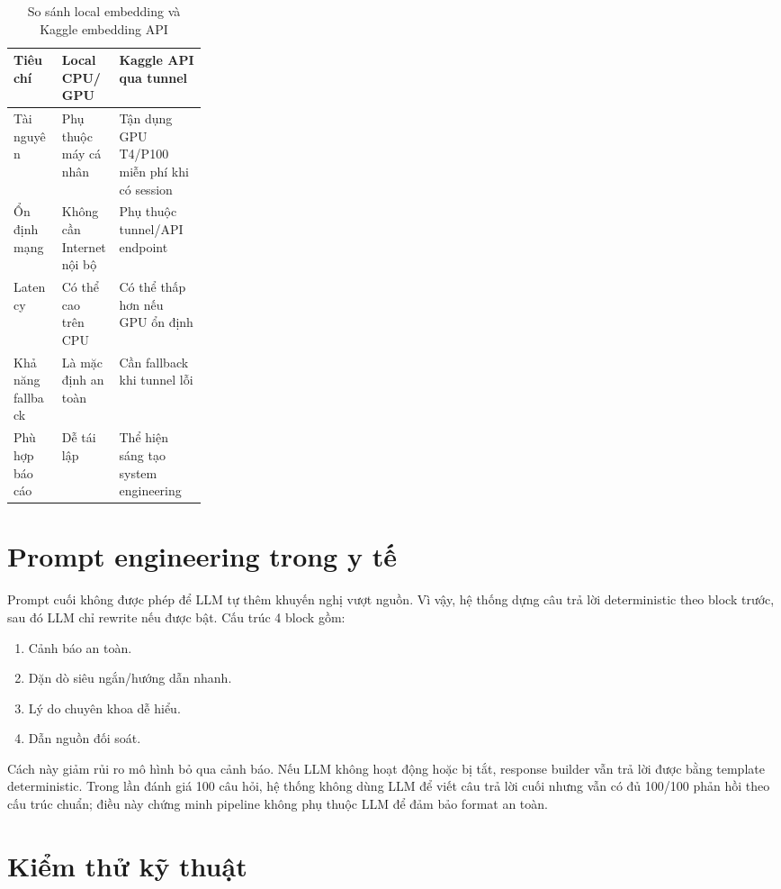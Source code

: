 \begin{table}[H]
\centering
\small
\caption{So sánh local embedding và Kaggle embedding API}
\begin{tabularx}{\linewidth}{p{0.25\linewidth} Y Y}
\toprule
\textbf{Tiêu chí} & \textbf{Local CPU/GPU} & \textbf{Kaggle API qua tunnel} \\
\midrule
Tài nguyên & Phụ thuộc máy cá nhân & Tận dụng GPU T4/P100 miễn phí khi có session \\
Ổn định mạng & Không cần Internet nội bộ & Phụ thuộc tunnel/API endpoint \\
Latency & Có thể cao trên CPU & Có thể thấp hơn nếu GPU ổn định \\
Khả năng fallback & Là mặc định an toàn & Cần fallback khi tunnel lỗi \\
Phù hợp báo cáo & Dễ tái lập & Thể hiện sáng tạo system engineering \\
\bottomrule
\end{tabularx}
\end{table}

\section{Prompt engineering trong y tế}

Prompt cuối không được phép để LLM tự thêm khuyến nghị vượt nguồn. Vì vậy, hệ thống dựng câu trả lời deterministic theo block trước, sau đó LLM chỉ rewrite nếu được bật. Cấu trúc 4 block gồm:

\begin{enumerate}
  \item Cảnh báo an toàn.
  \item Dặn dò siêu ngắn/hướng dẫn nhanh.
  \item Lý do chuyên khoa dễ hiểu.
  \item Dẫn nguồn đối soát.
\end{enumerate}

Cách này giảm rủi ro mô hình bỏ qua cảnh báo. Nếu LLM không hoạt động hoặc bị tắt, response builder vẫn trả lời được bằng template deterministic. Trong lần đánh giá 100 câu hỏi, hệ thống không dùng LLM để viết câu trả lời cuối nhưng vẫn có đủ 100/100 phản hồi theo cấu trúc chuẩn; điều này chứng minh pipeline không phụ thuộc LLM để đảm bảo format an toàn.

\section{Kiểm thử kỹ thuật}

